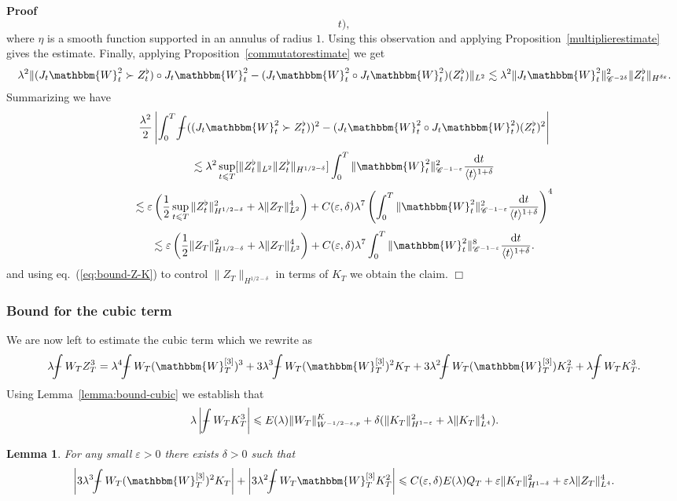 \documentclass[11pt, oneside]{article}   	%
\newcommand{\mathd}{\mathrm{d}}
\newenvironment{proof}{\noindent\textbf{Proof\ }}{\hspace*{\fill}$\Box$\medskip}
\newtheorem{lemma}{Lemma}
\def\Xint#1{\mathchoice
{\XXint\displaystyle\textstyle{#1}}%
{\XXint\textstyle\scriptstyle{#1}}%
{\XXint\scriptstyle\scriptscriptstyle{#1}}%
{\XXint\scriptscriptstyle\scriptscriptstyle{#1}}%
\!\int}
\def\XXint#1#2#3{{\setbox0=\hbox{$#1{#2#3}{\int}$ }
\vcenter{\hbox{$#2#3$ }}\kern-.6\wd0}}
\def\dashint{\Xint-}
\newcommand{\bint}{\dashint}
\newcommand{\VV}{\mathscr{C}}
\begin{document}
\begin{proof}
\[     t), \]
  where $\eta$ is a smooth function supported in an annulus of radius $1$.
  Using this observation and applying Proposition~\ref{multiplierestimate}
  gives the estimate. Finally, applying Proposition~\ref{commutatorestimate}
  we get
  \[ \lambda^2 \| (J_t \mathbbm{W}^2_t \succ Z^{\flat}_t) \circ J_t
     \mathbbm{W}^2_t - (J_t \mathbbm{W}^2_t \circ J_t \mathbbm{W}^2_t)
     (Z^{\flat}_t) \|_{L^2} \lesssim \lambda^2 \| J_t \mathbbm{W}^2_t
     \|_{\VV^{- 2 \delta}}^2  \| Z^\flat_t \|_{H^{\delta \varepsilon}} . \]
  Summarizing we have
  \[ \frac{\lambda^2}{2} \left| \int^T_0 \bint ((J_t \mathbbm{W}^2_t \succ
     Z^{\flat}_t))^2 - (J_t \mathbbm{W}^2_t \circ J_t \mathbbm{W}^2_t)
     (Z^{\flat}_t)^2 \right| \]
  \[ \lesssim \lambda^2 \sup_{t \leqslant T}  [\| Z^{\flat}_t  \|_{L^2} \|
     Z^{\flat}_t  \|_{H^{1 / 2 - \delta}}] \int_0^T \| \mathbbm{W}^2_t
     \|^2_{\VV^{- 1 - \varepsilon}} \frac{\mathd t}{\langle t \rangle^{1 +
     \delta}} \]
  \[ \lesssim \varepsilon \left( \frac{1}{2} \sup_{t \leqslant T} \|
     Z^{\flat}_t  \|_{H^{1 / 2 - \delta}}^2 + \lambda \| Z_T \|_{L^2}^4
     \right) + C (\varepsilon, \delta) \lambda^7 \left( \int_0^T \|
     \mathbbm{W}^2_t \|^2_{\VV^{- 1 - \varepsilon}} \frac{\mathd t}{\langle t
     \rangle^{1 + \delta}} \right)^4 \]
  \[ \lesssim \varepsilon \left( \frac{1}{2} \| Z_T \|_{H^{1 / 2 - \delta}}^2
     + \lambda \| Z_T \|_{L^2}^4 \right) + C (\varepsilon, \delta) \lambda^7
     \int_0^T \| \mathbbm{W}^2_t \|^8_{\VV^{- 1 - \varepsilon}} \frac{\mathd
     t}{\langle t \rangle^{1 + \delta}} . \]
  and using eq.~(\ref{eq:bound-Z-K}) to control $\| Z_T \|_{H^{1 / 2 -
  \delta}}$ in terms of $K_T$ we obtain the claim.
\end{proof}

\subsubsection{Bound for the cubic term}

We are now left to estimate the cubic term which we rewrite as
\[ \lambda \bint W_T Z^3_T = \lambda^4 \bint W_T (\mathbbm{W}_T^{[3]})^3 + 3
   \lambda^3 \bint W_T (\mathbbm{W}_T^{[3]})^2 K_T + 3 \lambda^2 \bint W_T
   (\mathbbm{W}_T^{[3]}) K^2_T + \lambda \bint W_T K^3_T . \]
Using Lemma~\ref{lemma:bound-cubic} we establish that
\[ \lambda \left| \bint W_T K^3_T \right| \leqslant E (\lambda) \| W_T
   \|^K_{W^{- 1 / 2 - \varepsilon, p}} + \delta (\| K_T \|^2_{H^{1 -
   \varepsilon}} + \lambda \| K_T \|^4_{L^4}) . \]
\begin{lemma}
  For any small $\varepsilon > 0$ there exists $\delta > 0$ such that
  \[ \left| 3 \lambda^3 \bint W_T (\mathbbm{W}_T^{[3]})^2 K_T \right| + \left|
     3 \lambda^2 \bint W_T \mathbbm{W}_T^{[3]} K^2_T \right| \leqslant C
     (\varepsilon, \delta) E (\lambda) Q_T + \varepsilon \| K_T \|^2_{H^{1 -
     \delta}} + \varepsilon \lambda \| Z_T \|^4_{L^4} . \]
\end{lemma}
\end{document}
